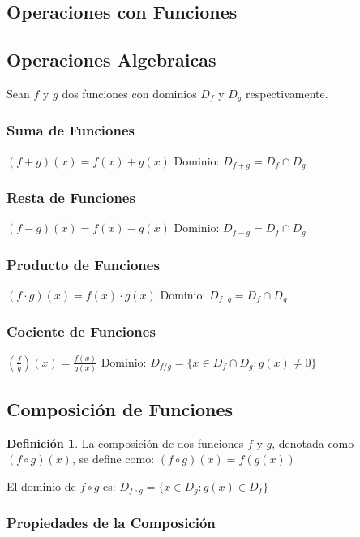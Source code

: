 \documentclass[12pt, a4paper, oneside]{book}
\theoremstyle{definition}
\newtheorem{definicion}{Definición}[chapter]
\begin{document}
\subsection{Operaciones con Funciones}

\subsection{Operaciones Algebraicas}

Sean $f$ y $g$ dos funciones con dominios $D_f$ y $D_g$ respectivamente.

\subsubsection{Suma de Funciones}
$(f + g)(x) = f(x) + g(x)$
Dominio: $D_{f+g} = D_f \cap D_g$

\subsubsection{Resta de Funciones}
$(f - g)(x) = f(x) - g(x)$
Dominio: $D_{f-g} = D_f \cap D_g$

\subsubsection{Producto de Funciones}
$(f \cdot g)(x) = f(x) \cdot g(x)$
Dominio: $D_{f \cdot g} = D_f \cap D_g$

\subsubsection{Cociente de Funciones}
$\left(\frac{f}{g}\right)(x) = \frac{f(x)}{g(x)}$
Dominio: $D_{f/g} = \{x \in D_f \cap D_g : g(x) \neq 0\}$

\subsection{Composición de Funciones}

\begin{definicion}
La composición de dos funciones $f$ y $g$, denotada como $(f \circ g)(x)$, se define como:
$(f \circ g)(x) = f(g(x))$
\end{definicion}

El dominio de $f \circ g$ es:
$D_{f \circ g} = \{x \in D_g : g(x) \in D_f\}$

\subsubsection{Propiedades de la Composición}
\end{document}

